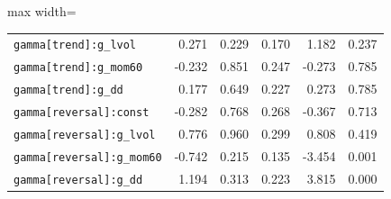 \begin{table}[!htbp]
\begin{adjustbox}{max width=\textwidth}
\begin{tabular}{lrrrrr}
\texttt{gamma[trend]:g\_lvol} & 0.271 & 0.229 & 0.170 & 1.182 & 0.237\\
\texttt{gamma[trend]:g\_mom60} & -0.232 & 0.851 & 0.247 & -0.273 & 0.785\\
\texttt{gamma[trend]:g\_dd} & 0.177 & 0.649 & 0.227 & 0.273 & 0.785\\
\texttt{gamma[reversal]:const} & -0.282 & 0.768 & 0.268 & -0.367 & 0.713\\
\texttt{gamma[reversal]:g\_lvol} & 0.776 & 0.960 & 0.299 & 0.808 & 0.419\\
\texttt{gamma[reversal]:g\_mom60} & -0.742 & 0.215 & 0.135 & -3.454 & 0.001\\
\texttt{gamma[reversal]:g\_dd} & 1.194 & 0.313 & 0.223 & 3.815 & 0.000\\
\bottomrule
\end{tabular}
\end{adjustbox}
\end{table}